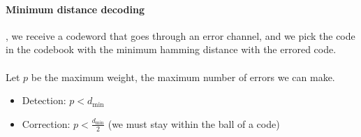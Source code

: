 \documentclass{article}
\begin{document}
\paragraph{Minimum distance decoding}, we receive a codeword that goes through an error channel, and we pick the code in the codebook with the minimum hamming distance with the errored code.\\\\
Let \( p \) be the maximum weight, the maximum number of errors we can make.

\begin{itemize}
    \item Detection: \( p < d_{\text{min}} \)
    \item Correction: \( p < \frac{d_{\text{min}}}{2} \) (we must stay within the ball of a code)
\end{itemize}
\end{document}

